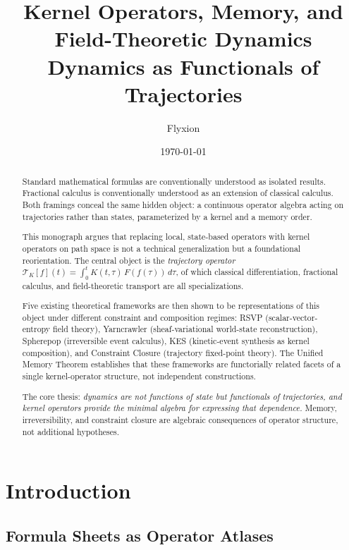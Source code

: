 \documentclass[12pt]{article}
\title{%
  \textbf{Kernel Operators, Memory, and Field-Theoretic Dynamics}\\[0.5em]
  \large Dynamics as Functionals of Trajectories
}
\author{Flyxion}
\date{\today}
\newcommand{\TK}{\mathcal{T}_K}
\begin{document}
\maketitle
\thispagestyle{empty}

\begin{abstract}
\noindent
Standard mathematical formulas are conventionally understood as isolated results.
Fractional calculus is conventionally understood as an extension of classical
calculus. Both framings conceal the same hidden object: a continuous operator
algebra acting on trajectories rather than states, parameterized by a kernel
and a memory order.

This monograph argues that replacing local, state-based operators with kernel
operators on path space is not a technical generalization but a foundational
reorientation. The central object is the \emph{trajectory operator}
$\TK[f](t) = \int_0^t K(t,\tau)\,F(f(\tau))\,d\tau$, of which classical
differentiation, fractional calculus, and field-theoretic transport are all
specializations.

Five existing theoretical frameworks are then shown to be representations
of this object under different constraint and composition regimes:
RSVP (scalar-vector-entropy field theory), Yarncrawler (sheaf-variational
world-state reconstruction), Spherepop (irreversible event calculus),
KES (kinetic-event synthesis as kernel composition), and Constraint Closure
(trajectory fixed-point theory). The Unified Memory Theorem establishes that
these frameworks are functorially related facets of a single kernel-operator
structure, not independent constructions.

The core thesis: \emph{dynamics are not functions of state but functionals of
trajectories, and kernel operators provide the minimal algebra for expressing
that dependence.} Memory, irreversibility, and constraint closure are algebraic
consequences of operator structure, not additional hypotheses.
\end{abstract}

\newpage
\tableofcontents
\newpage

\section{Introduction}

\subsection{Formula Sheets as Operator Atlases}
\end{document}
